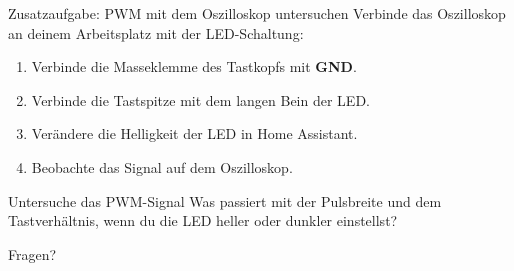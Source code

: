 \documentclass[11pt,aspectratio=169]{beamer}
\begin{document}
\begin{frame}{{\small Zusatzaufgabe: PWM mit dem Oszilloskop untersuchen}}
  Verbinde das Oszilloskop an deinem Arbeitsplatz mit der LED-Schaltung:

  \begin{enumerate}
    \item Verbinde die Masseklemme des Tastkopfs mit \textbf{GND}.
    \item Verbinde die Tastspitze mit dem langen Bein der LED.
    \item Verändere die Helligkeit der LED in Home Assistant.
    \item Beobachte das Signal auf dem Oszilloskop.
  \end{enumerate}

  \vspace{0.8em}

  \begin{alertblock}{Untersuche das PWM-Signal}
    Was passiert mit der Pulsbreite und dem Tastverhältnis, wenn du die LED
    heller oder dunkler einstellst?
  \end{alertblock}
\end{frame}

\begin{frame}
  \centering
  \vfill
  {\Huge\color{blue!70!black} Fragen?}
  \vfill
\end{frame}
\end{document}
